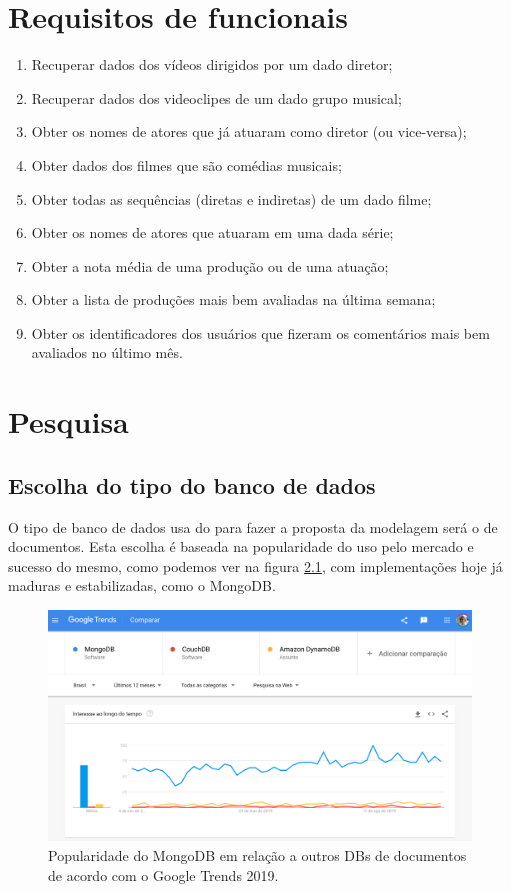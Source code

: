 \documentclass[
	12pt,				%
	openright,			%
	oneside,			%
	a4paper,			%
	english,			%
	french,				%
	spanish,			%
	brazil,				%
	]{abntex2}
\begin{document}
\chapter{Requisitos de funcionais}
\begin{enumerate}
  \item Recuperar dados dos vídeos dirigidos por um dado diretor;
	\item Recuperar dados dos videoclipes de um dado grupo musical;
	\item Obter os nomes de atores que já atuaram como diretor (ou vice-versa);
	\item Obter dados dos filmes que são comédias musicais;
	\item Obter todas as sequências (diretas e indiretas) de um dado filme;
	\item Obter os nomes de atores que atuaram em uma dada série;
	\item Obter a nota média de uma produção ou de uma atuação;
	\item Obter a lista de produções mais bem avaliadas na última semana;
	\item Obter os identificadores dos usuários que fizeram os comentários mais bem avaliados no último mês.
\end{enumerate}

\chapter{Pesquisa}

\section{Escolha do tipo do banco de dados}

O tipo de banco de dados usa do para fazer a proposta da modelagem será o de documentos. Esta escolha é baseada na popularidade do uso pelo mercado e sucesso do mesmo, como podemos ver na figura \ref{plot:trends}, com implementações hoje já maduras e estabilizadas, como o MongoDB. 

\begin{figure}[!htpb]
	\centering
	\includegraphics[width=400pt]{./imagens/trends.png}
	\caption{Popularidade do MongoDB em relação a outros DBs de documentos de acordo com o Google Trends 2019.}
	\label{plot:trends}
\end{figure}
\end{document}
